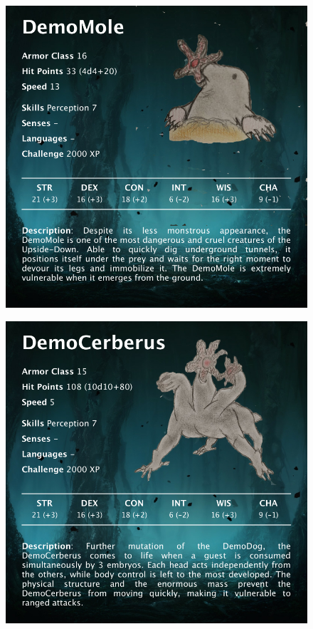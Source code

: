 \begin{figure}[H]
	\centering
	\includegraphics[width=0.7\linewidth]{images/visual_stats/demomole.png}
\end{figure}


\begin{figure}[H]
	\centering
	\includegraphics[width=0.7\linewidth]{images/visual_stats/democerberus.png}
\end{figure}

